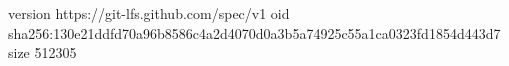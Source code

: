 version https://git-lfs.github.com/spec/v1
oid sha256:130e21ddfd70a96b8586c4a2d4070d0a3b5a74925c55a1ca0323fd1854d443d7
size 512305
